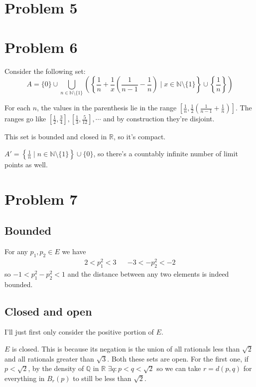 \documentclass[12pt]{article}
\newcommand{\N}{\mathbb{N}}
\newcommand{\R}{\mathbb{R}}
\newcommand{\Q}{\mathbb{Q}}
\begin{document}
\pagebreak

\section{Problem 5}

\section{Problem 6}

Consider the following set:
\[A=\{0\} \cup
  \bigcup_{n \in \N \setminus \{1\}}
  \left(\left\{\frac{1}{n} + \frac{1}{x}\left(\frac{1}{n-1}-\frac{1}{n}\right)
  \mid x \in \N \setminus \{1\}\right\}
  \cup \left\{\frac{1}{n}\right\}\right)\]

For each $n$, the values in the parenthesis lie in the range $\left[\frac{1}{n}, \frac{1}{2}\left(\frac{1}{n-1}+\frac{1}{n}\right)\right]$.
The ranges go like $\left[\frac{1}{2}, \frac{3}{4}\right], \left[\frac{1}{3}, \frac{5}{12}\right], \cdots$
and by construction they're disjoint.

This set is bounded and closed in $\R$, so it's compact.

$A'=\left\{\frac{1}{n} \mid n \in \N \setminus \{1\}\right\} \cup \{0\}$,
so there's a countably infinite number of limit points as well.

\pagebreak

\section{Problem 7}

\subsection{Bounded}

For any $p_1, p_2 \in E$ we have
\begin{align*}
  2 < p_1^2 < 3 &  & -3 < -p_2^2 < -2
\end{align*}
so $-1 < p_1^2-p_2^2 < 1$ and the distance between any two elements is indeed bounded.

\subsection{Closed and open}

I'll just first only consider the positive portion of $E$.

$E$ is closed.
This is because its negation is the union of all rationals less than $\sqrt{2}$ and all rationals greater than $\sqrt{3}$.
Both these sets are open.
For the first one, if $p < \sqrt{2}$,
by the density of $\Q$ in $\R$ $\exists q: p < q < \sqrt{2}$ so we can take
$r=d(p, q)$ for everything in $B_r(p)$ to still be less than $\sqrt{2}$.
\end{document}
